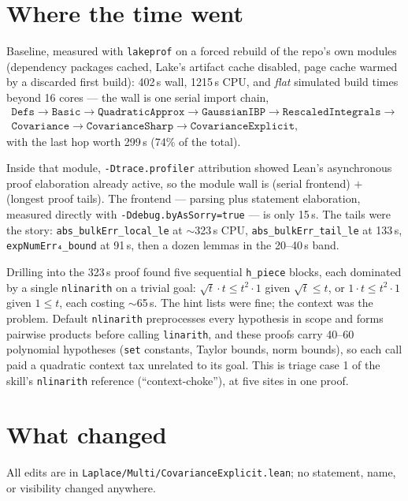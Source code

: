 \documentclass[11pt]{article}
\begin{document}
\section{Where the time went}

Baseline, measured with \texttt{lakeprof} on a forced rebuild of the
repo's own modules (dependency packages cached, Lake's artifact cache
disabled, page cache warmed by a discarded first build): 402\,s wall,
1215\,s CPU, and \emph{flat} simulated build times beyond 16 cores ---
the wall is one serial import chain,
\begin{gather*}
\texttt{Defs} \to \texttt{Basic} \to \texttt{QuadraticApprox} \to
\texttt{GaussianIBP} \to \texttt{RescaledIntegrals} \to {}\\
\texttt{Covariance} \to \texttt{CovarianceSharp} \to
\texttt{CovarianceExplicit},
\end{gather*}
with the last hop worth 299\,s (74\% of the total).

Inside that module, \texttt{-Dtrace.profiler} attribution showed Lean's
asynchronous proof elaboration already active, so the module wall is
(serial frontend) $+$ (longest proof tails). The frontend --- parsing
plus statement elaboration, measured directly with
\texttt{-Ddebug.byAsSorry=true} --- is only 15\,s. The tails were the
story: \texttt{abs\_bulkErr\_local\_le} at $\sim$323\,s CPU,
\texttt{abs\_bulkErr\_tail\_le} at 133\,s, \texttt{expNumErr₄\_bound} at
91\,s, then a dozen lemmas in the 20--40\,s band.

Drilling into the 323\,s proof found five sequential \texttt{h\_piece}
blocks, each dominated by a single \texttt{nlinarith} on a trivial
goal: $\surd t \cdot t \le t^2 \cdot 1$ given $\surd t \le t$, or $1
\cdot t \le t^2 \cdot 1$ given $1 \le t$, each costing $\sim$65\,s.
The hint lists were fine; the context was the problem. Default
\texttt{nlinarith} preprocesses every hypothesis in scope and forms
pairwise products before calling \texttt{linarith}, and these proofs
carry 40--60 polynomial hypotheses (\texttt{set} constants, Taylor
bounds, norm bounds), so each call paid a quadratic context tax
unrelated to its goal. This is triage case 1 of the skill's
\texttt{nlinarith} reference (``context-choke''), at five sites in one
proof.

\section{What changed}

All edits are in \texttt{Laplace/Multi/CovarianceExplicit.lean}; no
statement, name, or visibility changed anywhere.
\end{document}
